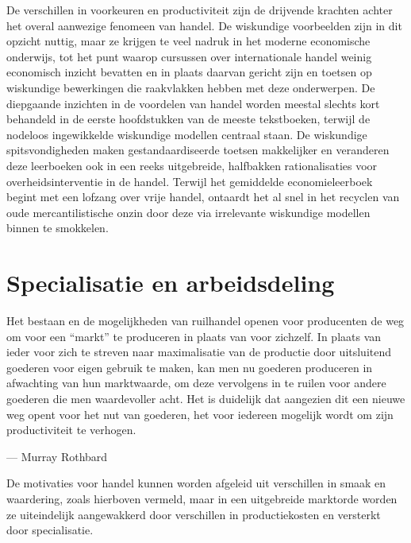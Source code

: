 De verschillen in voorkeuren en productiviteit zijn de drijvende krachten achter het overal aanwezige fenomeen van handel. De wiskundige voorbeelden zijn in dit opzicht nuttig, maar ze krijgen te veel nadruk in het moderne economische onderwijs, tot het punt waarop cursussen over internationale handel weinig economisch inzicht bevatten en in plaats daarvan gericht zijn en toetsen op wiskundige bewerkingen die raakvlakken hebben met deze onderwerpen. De diepgaande inzichten in de voordelen van handel worden meestal slechts kort behandeld in de eerste hoofdstukken van de meeste tekstboeken, terwijl de nodeloos ingewikkelde wiskundige modellen centraal staan. De wiskundige spitsvondigheden maken gestandaardiseerde toetsen makkelijker en veranderen deze leerboeken ook in een reeks uitgebreide, halfbakken rationalisaties voor overheidsinterventie in de handel. Terwijl het gemiddelde economieleerboek begint met een lofzang over vrije handel, ontaardt het al snel in het recyclen van oude mercantilistische onzin door deze via irrelevante wiskundige modellen binnen te smokkelen.

\hypertarget{specialisatie-en-arbeidsverdeling}{%
\section{Specialisatie en arbeidsdeling}\label{specialisatie-en-arbeidsverdeling}}

\begin{blockquotebox}
    Het bestaan en de mogelijkheden van ruilhandel openen voor producenten de weg om voor een ``markt'' te produceren in plaats van voor zichzelf. In plaats van ieder voor zich te streven naar maximalisatie van de productie door uitsluitend goederen voor eigen gebruik te maken, kan men nu goederen produceren in afwachting van hun marktwaarde, om deze vervolgens in te ruilen voor andere goederen die men waardevoller acht. Het is duidelijk dat aangezien dit een nieuwe weg opent voor het nut van goederen, het voor iedereen mogelijk wordt om zijn productiviteit te verhogen.\footnotemark
    \par\raggedleft--- Murray Rothbard
\end{blockquotebox}
\autocite{106}

De motivaties voor handel kunnen worden afgeleid uit verschillen in smaak en waardering, zoals hierboven vermeld, maar in een uitgebreide marktorde worden ze uiteindelijk aangewakkerd door verschillen in productiekosten en versterkt door specialisatie.

